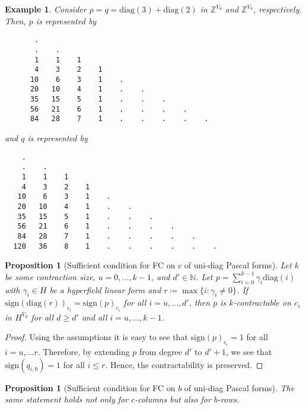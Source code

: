 \documentclass[11pt]{article}
\newtheorem{proposition}[theorem]{Proposition}
\newtheorem{example}[theorem]{Example}
\begin{document}
\begin{example}
  Consider \( p = q = \mathrm{diag}(3) + \mathrm{diag}(2) \) in \( \mathbb{Z}^{V_8} \) and \( \mathbb{Z}^{V_9} \), respectively. Then, \( p \) is represented by 
  \begin{verbatim}
       . 
       .    . 
       1    1    1 
       4    3    2    1 
      10    6    3    1    . 
      20   10    4    1    .    . 
      35   15    5    1    .    .    . 
      56   21    6    1    .    .    .    . 
      84   28    7    1    .    .    .    .    .  
  \end{verbatim}
  and \( q \) is represented by
  \begin{verbatim}
    . 
    .    . 
    1    1    1 
    4    3    2    1 
   10    6    3    1    . 
   20   10    4    1    .    . 
   35   15    5    1    .    .    . 
   56   21    6    1    .    .    .    . 
   84   28    7    1    .    .    .    .    . 
  120   36    8    1    .    .    .    .    .    . 
  \end{verbatim}
\end{example}


\begin{proposition}[Sufficient condition for FC on \( c \) of uni-diag Pascal forms]\label{prop:fixed-contraction-homo-diag}
  Let $k$ be some contraction size, $u = 0, \dots, k -1$, and $d' \in \mathbb{N}$. Let $p = \sum_{i=0}^{k-1} \gamma_{i} \mathrm{diag}(i)$ with $\gamma_{i} \in H$ be a hyperfield linear form and $r \coloneqq \max\{ i : \gamma_{i} \neq 0 \}$. If $\mathrm{sign}(\mathrm{diag}(r))_{c_i} = \mathrm{sign}(p)_{c_i}$ for all \( i = u, \dots, d'\), then $p$ is $k$-contractable on $c_{i}$ in $H^{V_{d}}$ for all $d \geq d'$ and all \( i=u, \dots, k-1 \).  
\end{proposition}

\begin{proof}
  Using the assumptions it is easy to see that \( \mathrm{sign}(p)_{c_i} = 1 \) for all \( i = u, \dots r \). Therefore, by extending \( p \) from degree \( d' \) to \( d' + 1 \), we see that \( \mathrm{sign}(q_{i,0}) = 1 \) for all \( i \leq r \). Hence, the contractability is preserved.
\end{proof}

\begin{proposition}[Sufficient condition for FC on \( b \) of uni-diag Pascal forms]\label{prop:fixed-contraction-homo-diag}
  The same statement holds not only for \( c \)-columns but also for \( b \)-rows.
\end{proposition}
\end{document}
